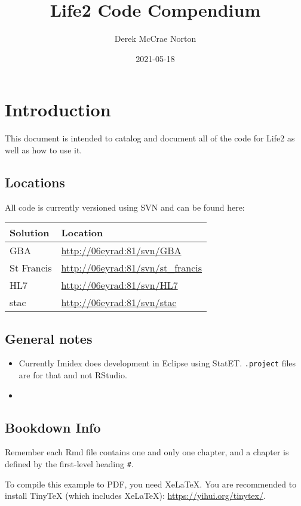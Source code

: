 \documentclass[
]{book}
\title{Life2 Code Compendium}
\author{Derek McCrae Norton}
\date{2021-05-18}
\begin{document}
\maketitle

{
\setcounter{tocdepth}{1}
\tableofcontents
}
\hypertarget{intro}{%
\chapter{Introduction}\label{intro}}

This document is intended to catalog and document all of the code for Life2 as well as how to use it.

\hypertarget{locations}{%
\section{Locations}\label{locations}}

All code is currently versioned using SVN and can be found here:

\begin{longtable}[]{@{}ll@{}}
\toprule
Solution & Location\tabularnewline
\midrule
\endhead
GBA & \url{http://06eyrad:81/svn/GBA}\tabularnewline
St Francis & \url{http://06eyrad:81/svn/st_francis}\tabularnewline
HL7 & \url{http://06eyrad:81/svn/HL7}\tabularnewline
stac & \url{http://06eyrad:81/svn/stac}\tabularnewline
\bottomrule
\end{longtable}

\hypertarget{general-notes}{%
\section{General notes}\label{general-notes}}

\begin{itemize}
\item
  Currently Imidex does development in Eclipse using StatET. \texttt{.project} files are for that and not RStudio.
\item
\end{itemize}

\hypertarget{bookdown-info}{%
\section{Bookdown Info}\label{bookdown-info}}

Remember each Rmd file contains one and only one chapter, and a chapter is defined by the first-level heading \texttt{\#}.

To compile this example to PDF, you need XeLaTeX. You are recommended to install TinyTeX (which includes XeLaTeX): \url{https://yihui.org/tinytex/}.
\end{document}
